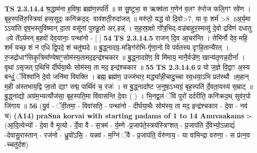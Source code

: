\documentclass[17pt]{extarticle}
\begin{document}
                  \newline
                                \textbf{ TS 2.3.14.4} \newline
                  श्र॒द्धाम॑ना ह॒विषा॒ ब्रह्म॑ण॒स्पतिं᳚ ॥ स सु॒ष्टुभा॒ स ऋक्व॑ता ग॒णेन॑ व॒लꣳ रु॑रोज फलि॒गꣳ रवे॑ण । बृह॒स्पति॑रु॒स्त्रिया॑ हव्य॒सूदः॒ कनि॑क्रद॒द्- वाव॑शती॒रुदा॑जत् ॥ मरु॑तो॒ यद्ध॑ वो दि॒वो>7, या वः॒ शर्म॑ >8 ॥अ॒र्य॒मा ऽऽया॑ति वृष॒भस्तुवि॑ष्मान् दा॒ता वसू॑नां पुरुहू॒तो अर्.हन्न्॑ । स॒ह॒स्रा॒क्षो गो᳚त्र॒भिद्-वज्र॑बाहुर॒स्मासु॑ दे॒वो द्रवि॑णं दधातु ॥ये ते᳚ऽर्यमन् ब॒हवो॑ देव॒यानाः॒ पन्था॑नो - [  ] \textbf{  54} \newline
                  \newline
                                \textbf{ TS 2.3.14.5} \newline
                  राजन् दि॒व आ॒चर॑न्ति । तेभि॑र्नो देव॒ महि॒ शर्म॑ यच्छ॒ शं न॑ एधि द्वि॒पदे॒ शं चतु॑ष्पदे ॥ बु॒द्ध्नादग्र॒-मङ्गि॑रोभि-र्गृणा॒नो वि पर्व॑तस्य दृꣳहि॒तान्यै॑रत् । रु॒जद्रोधाꣳ॑सिकृ॒त्रिमा᳚ण्येषाꣳ॒॒सोम॑स्य॒तामद॒इन्द्र॑श्चकार ॥ बु॒द्ध्नादग्रे॑ण॒ वि मि॑माय॒ मानै॒र्वज्रे॑ण॒ खान्य॑तृणन्न॒दीनां᳚ । वृथा॑ ऽसृजत् प॒थिभि॑ र्दीर्घया॒थैः सोम॑स्य॒ ता मद॒ इन्द्र॑श्चकार ॥ \textbf{  55} \newline
                  \newline
                                \textbf{ TS 2.3.14.6} \newline
                  प्र यो ज॒ज्ञे वि॒द्वाꣳ अ॒स्य बन्धुं॒ ॅविश्वा॑नि दे॒वो जनि॑मा विवक्ति । ब्रह्म॒ ब्रह्म॑ण॒ उज्ज॑भार॒ मद्ध्या᳚न्नी॒चादु॒च्चा स्व॒धया॒ऽभि प्रत॑स्थौ ॥म॒हान् म॒ही अ॑स्तभाय॒द्वि जा॒तो द्याꣳ सद्म॒ पार्थि॑वं च॒ रजः॑ । स बु॒द्ध्नादा᳚ष्ट ज॒नुषा॒ऽभ्यग्रं॒ बृह॒स्पति॑ र्दे॒वता॒यस्य॑ स॒म्राट् ॥ बु॒द्ध्नाद्यो अग्र॑म॒भ्यर्त्योज॑सा॒ बृह॒स्पति॒मा वि॑वासन्ति दे॒वाः ( ) । भि॒नद्व॒लं ॅवि पुरो॑ दर्दरीति॒ कनि॑क्रद॒थ् सुव॑र॒पो जि॑गाय ॥ \textbf{  56} \newline
                  \newline
                      (यु॒वं - ॅवी॒तमा॒ - विवा॑सति॒ - पन्था॑नो - दीर्घया॒थैः सोम॑स्य॒ ता मद॒ इन्द्र॑श्चकार - दे॒वा - नव॑ च)  \textbf{(A14)} \newline \newline
                \textbf{praSna korvai with starting padams of 1 to 14 Anuvaakams :-} \newline
        (आ॒दि॒त्येभ्यो॑ - दे॒वा वै मृ॒त्यो - र्दे॒वा वै - स॒त्रम॑ - र्य॒म्णे -प्र॒जाप॑ते॒स्त्रय॑स्त्रिꣳशत् - प्र॒जाप॑ति र्दे॒वेभ्यो॒ऽन्नाद्यं॑ -देवासु॒रास्तान् - रज॑नो - ध्रु॒वो॑ऽसि॒ - यन्नव॑ - म॒ग्निं ॅवै - प्र॒जाप॑ति॒ र्वरु॑णाय॒ - या वा॑मिन्द्रा वरुणा॒ - स प्र॑त्न॒व -च्चतु॑र्दश) \newline
\end{document}
